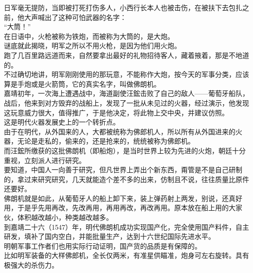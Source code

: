 \begin{multicols}{\theparacolNo}
日军毫无提防，当即被打死打伤多人，小西行长本人也被击伤，在被扶下去包扎之前，他大声喊出了这种可怕武器的名字：\\

“大筒！”\\

在日语中，火枪被称为铁炮，而被称为大筒的，是大炮。\\

谜底就此揭晓，明军之所以不用火枪，是因为他们用火炮。\\

跑了几百里路远道而来，自然要拿出最好的礼物招待客人，藏着掖着，那是不地道的。\\

不过确切地讲，明军刚刚使用的那玩意，不能称作大炮，按今天的军事分类，应该算是手炮或是火箭筒，它的真实名字，叫做佛朗机。\\

嘉靖初年，一次海上遭遇战中，海道副使汪鋐击败了自己的敌人——葡萄牙船队，战后，他来到对方毁弃的战船上，发现了一批从未见过的火器，经过演示，他发现这玩意威力很大，值得推广，于是他决定，将此物上交中央，并建议仿照。\\

这是明代火器发展史上的一个转折点。\\

由于在明代，从外国来的人，大都被统称为佛郎机人，所以所有从外国进来的火器，无论是走私的，偷来的，还是抢来的，统统被称为佛郎机。\\

而汪鋐所缴获的这批佛朗机（即船炮），是当时世界上较为先进的火炮，朝廷十分重视，立刻派人进行研究。\\

要知道，中国人一向善于研究，但凡世界上弄出个新东西，甭管是不是自己研制的，拿过来研究研究，几天就能造个差不多的出来，仿制且不说，往往质量比原件还要好。\\

佛朗机就是如此，从葡萄牙人的船上卸下来，装上弹药射上两发，别说，还真好用，于是乎先用再改，先改再用，再用再改，再改再用。原本放在船上用的大家伙，体积越改越小，种类越改越多。\\

到嘉靖二十六（1547）年，明代佛朗机成功实现国产化，完全使用国产料件，自主研发，填补了国内空白，并能批量生产，达到十六世纪国际先进水平。\\

明朝军事工作者们也用实际行动证明，国产货的品质是有保障的。\\

比如明军装备的大样佛郎机，全长仅两米，有准星供瞄准，炮身可左右旋转。具有极强大的杀伤力。\\


\end{multicols}
